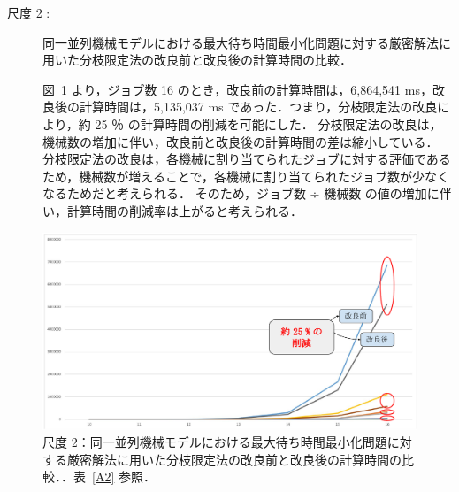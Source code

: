 \documentclass[12pt]{optlab-bachelor}
\begin{document}
\begin{description}
  \item[尺度 2 :] 同一並列機械モデルにおける最大待ち時間最小化問題に対する厳密解法に用いた分枝限定法の改良前と改良後の計算時間の比較．

  図~\ref{5.2} より，ジョブ数 16 のとき，改良前の計算時間は，6,864,541 ms，改良後の計算時間は，5,135,037 ms であった．つまり，分枝限定法の改良により，約 25 ％ の計算時間の削減を可能にした．
  分枝限定法の改良は，機械数の増加に伴い，改良前と改良後の計算時間の差は縮小している．
  分枝限定法の改良は，各機械に割り当てられたジョブに対する評価であるため，機械数が増えることで，各機械に割り当てられたジョブ数が少なくなるためだと考えられる．
  そのため，ジョブ数 ÷ 機械数 の値の増加に伴い，計算時間の削減率は上がると考えられる．
\end{description}
\begin{figure}[ht]
  \centering
  \includegraphics[width = 16cm]{figure/BandBTimeId.pdf}
  \caption{尺度 2：同一並列機械モデルにおける最大待ち時間最小化問題に対する厳密解法に用いた分枝限定法の改良前と改良後の計算時間の比較．．表~\ref{A2} 参照．}
  \label{5.2}
\end{figure}
\end{document}
